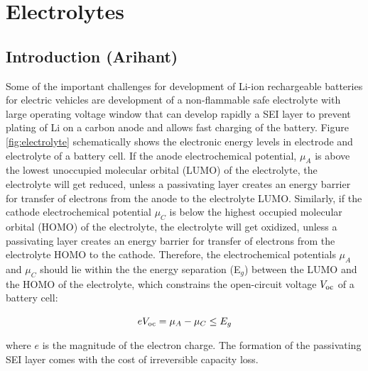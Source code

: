 \documentclass[../main.tex]{subfiles}
\begin{document}
\section{Electrolytes}
\label{sec:electrolytes}
\subsection{Introduction (Arihant)}%
\label{sec:introduction_electrolytes}
Some of the important challenges for development of Li-ion rechargeable batteries for electric vehicles are development of a non-flammable safe electrolyte with large operating voltage window that can develop rapidly a SEI layer to prevent plating of Li on a carbon anode and allows fast charging of the battery.\cite{Goodenough2010} Figure \ref{fig:electrolyte} schematically shows the electronic energy levels in electrode and electrolyte of a battery cell. If the anode electrochemical potential, $\mu_{A}$ is above the lowest unoccupied molecular orbital (LUMO) of the electrolyte, the electrolyte will get reduced, unless a passivating layer creates an energy barrier for transfer of electrons from the anode to the electrolyte LUMO. Similarly, if the cathode electrochemical potential $\mu_{C}$ is below the highest occupied molecular orbital (HOMO) of the electrolyte, the electrolyte will get oxidized, unless a passivating layer creates an energy barrier for transfer of electrons from the electrolyte HOMO to the cathode. Therefore, the electrochemical potentials $\mu_{A}$ and $\mu_{C}$ should lie within the the energy separation (E$_g$) between the LUMO and the HOMO of the electrolyte, which constrains the open-circuit voltage $V_{\rm oc}$ of a battery cell:

\begin{equation}
    eV_{\rm oc}=\mu_{A}-\mu_{C}\leq E_{g}
\end{equation}

where $e$ is the magnitude of the electron charge. %
The formation of the passivating SEI layer comes with the cost of irreversible capacity loss.
\end{document}
